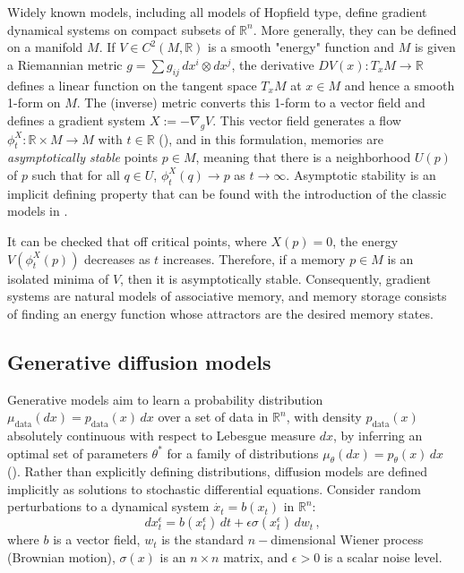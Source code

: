 \documentclass[12pt]{article}
\begin{document}
Widely known models, including all models of Hopfield type, define gradient dynamical systems on compact subsets of $\mathbb{R}^n$. More generally, they can be defined on a manifold $M$. If $V \in C^2(M, \mathbb{R})$ is a smooth "energy" function and $M$ is given a Riemannian metric $g = \sum g_{ij} \, dx^i \otimes dx^j$, the derivative $DV(x): T_xM \rightarrow \mathbb{R}$ defines a linear function on the tangent space $T_xM$ at $x \in M$ and hence a smooth 1-form on $M$. The (inverse) metric converts this 1-form to a vector field and defines a gradient system $X := - \nabla_g V$. This vector field generates a flow $\phi^X_t: \mathbb{R} \times M \rightarrow M$ with $t \in \mathbb{R}$ (), and in this formulation, memories are \textit{asymptotically stable} points $p \in M$, meaning that there is a neighborhood $U(p)$ of $p$ such that for all $q \in U$, $\phi_t^X(q) \rightarrow p$ as $t \rightarrow \infty$. Asymptotic stability is an implicit defining property that can be found with the introduction of the classic models in \cite{hopfield1982neural,hopfield1984neurons}. 

It can be checked that off critical points, where $X(p) = 0$, the energy $V\left(\phi_t^X(p)\right)$ decreases as $t$ increases. Therefore, if a memory $p \in M$ is an isolated minima of $V$, then it is asymptotically stable. Consequently, gradient systems are natural models of associative memory, and memory storage consists of finding an energy function whose attractors are the desired memory states.



\subsection{Generative diffusion models}
Generative models aim to learn a probability distribution ${\mu_{\text{data}}(dx) = p_{\text{data}}(x) \, dx}$ over a set of data in $\mathbb{R}^n$, with density \( p_{\text{data}}(x) \) absolutely continuous with respect to Lebesgue measure $dx$, by inferring an optimal set of parameters \( \theta^{*} \) for a family of distributions ${\mu_{\theta}(dx) = p_{\theta}(x) \, dx}$ (\cite{cotler2023renormalizing}). Rather than explicitly defining distributions, diffusion models are defined implicitly as solutions to stochastic differential equations. Consider random perturbations to a dynamical system $\dot{x_t} = b(x_t)$ in $\mathbb{R}^n$:
\begin{equation}
\label{equation:stochastic-ode}
    d{x_t^{\epsilon}} = b(x_t^{\epsilon}) \,dt + \epsilon \sigma(x_t^{\epsilon}) \,dw_t \, ,
\end{equation}
where $b$ is a vector field, $w_t$ is the standard $n-$dimensional Wiener process (Brownian motion), $\sigma(x)$ is an $n\times n$ matrix, and $\epsilon>0$ is a scalar noise level. 
\end{document}
